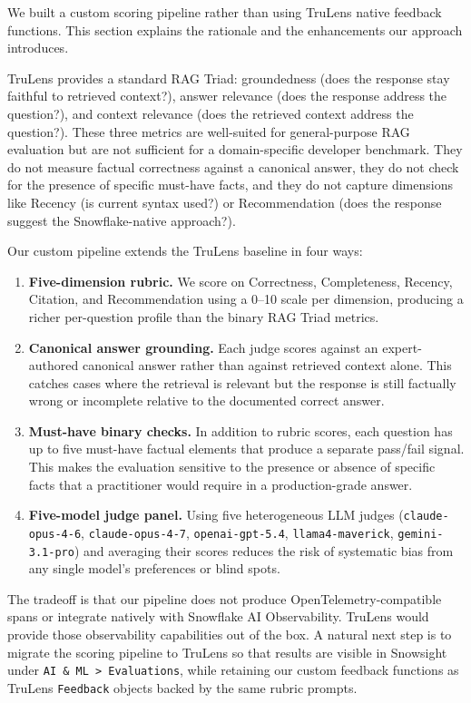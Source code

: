 \documentclass[10pt,letterpaper]{article}
\begin{document}
We built a custom scoring pipeline rather than using TruLens native feedback functions. This section explains the rationale and the enhancements our approach introduces.

TruLens provides a standard RAG Triad: groundedness (does the response stay faithful to retrieved context?), answer relevance (does the response address the question?), and context relevance (does the retrieved context address the question?). These three metrics are well-suited for general-purpose RAG evaluation but are not sufficient for a domain-specific developer benchmark. They do not measure factual correctness against a canonical answer, they do not check for the presence of specific must-have facts, and they do not capture dimensions like Recency (is current syntax used?) or Recommendation (does the response suggest the Snowflake-native approach?).

Our custom pipeline extends the TruLens baseline in four ways:

\begin{enumerate}[nosep]
  \item \textbf{Five-dimension rubric.} We score on Correctness, Completeness, Recency, Citation, and Recommendation using a 0--10 scale per dimension, producing a richer per-question profile than the binary RAG Triad metrics.
  \item \textbf{Canonical answer grounding.} Each judge scores against an expert-authored canonical answer rather than against retrieved context alone. This catches cases where the retrieval is relevant but the response is still factually wrong or incomplete relative to the documented correct answer.
  \item \textbf{Must-have binary checks.} In addition to rubric scores, each question has up to five must-have factual elements that produce a separate pass/fail signal. This makes the evaluation sensitive to the presence or absence of specific facts that a practitioner would require in a production-grade answer.
  \item \textbf{Five-model judge panel.} Using five heterogeneous LLM judges (\texttt{claude-opus-4-6}, \texttt{claude-opus-4-7}, \texttt{openai-gpt-5.4}, \texttt{llama4-maverick}, \texttt{gemini-3.1-pro}) and averaging their scores reduces the risk of systematic bias from any single model's preferences or blind spots.
\end{enumerate}

The tradeoff is that our pipeline does not produce OpenTelemetry-compatible spans or integrate natively with Snowflake AI Observability. TruLens would provide those observability capabilities out of the box. A natural next step is to migrate the scoring pipeline to TruLens so that results are visible in Snowsight under \texttt{AI \& ML > Evaluations}, while retaining our custom feedback functions as TruLens \texttt{Feedback} objects backed by the same rubric prompts.
\end{document}
